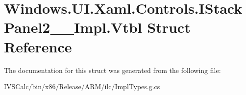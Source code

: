 \hypertarget{struct_windows_1_1_u_i_1_1_xaml_1_1_controls_1_1_i_stack_panel2_____impl_1_1_vtbl}{}\section{Windows.\+U\+I.\+Xaml.\+Controls.\+I\+Stack\+Panel2\+\_\+\+\_\+\+Impl.\+Vtbl Struct Reference}
\label{struct_windows_1_1_u_i_1_1_xaml_1_1_controls_1_1_i_stack_panel2_____impl_1_1_vtbl}


The documentation for this struct was generated from the following file\+:\begin{DoxyCompactItemize}
\item 
I\+V\+S\+Calc/bin/x86/\+Release/\+A\+R\+M/ilc/Impl\+Types.\+g.\+cs\end{DoxyCompactItemize}

